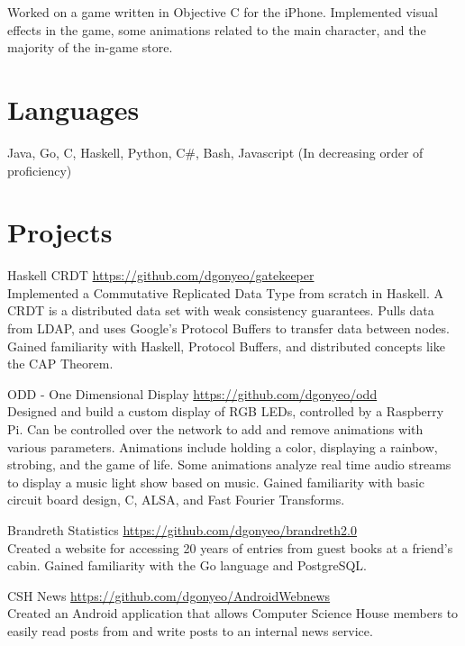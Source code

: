 \documentclass[letterpaper,margin,line,11pt]{resume}
\newcommand{\rurl}[1]{\hfill {\footnotesize \url{#1}}}
\begin{document}
\begin{resume}
\begin{asparadesc}
        \small
        Worked on a game written in Objective C for the iPhone. Implemented visual effects in the game, some animations related to the main character, and the majority of the in-game store.
        \normalsize
    \end{asparadesc}

\section{\mysidestyle Languages}
    Java, Go, C, Haskell, Python, C\#, Bash, Javascript 
    \hfill 
    \footnotesize 
    (In decreasing order of proficiency)
    \normalsize

\section{\mysidestyle Projects}
    \begin{compactdesc}
        \item[Haskell CRDT] \rurl{https://github.com/dgonyeo/gatekeeper} \\
            Implemented a Commutative Replicated Data Type from scratch in Haskell. A CRDT is a distributed data set with weak consistency guarantees. Pulls data from LDAP, and uses Google's Protocol Buffers to transfer data between nodes. Gained familiarity with Haskell, Protocol Buffers, and distributed concepts like the CAP Theorem.
        \item[ODD - One Dimensional Display] \rurl{https://github.com/dgonyeo/odd} \\
            Designed and build a custom display of RGB LEDs, controlled by a Raspberry Pi. Can be controlled over the network to add and remove animations with various parameters. Animations include holding a color, displaying a rainbow, strobing, and the game of life. Some animations analyze real time audio streams to display a music light show based on music. Gained familiarity with basic circuit board design, C, ALSA, and Fast Fourier Transforms.
        \item[Brandreth Statistics] \rurl{https://github.com/dgonyeo/brandreth2.0} \\
            Created a website for accessing 20 years of entries from guest books at a friend's cabin. Gained familiarity with the Go language and PostgreSQL.
        \item[CSH News] \rurl{https://github.com/dgonyeo/AndroidWebnews} \\
            Created an Android application that allows Computer Science House members to easily read posts from and write posts to an internal news service.
    \end{compactdesc}


\end{resume}
\end{document}
